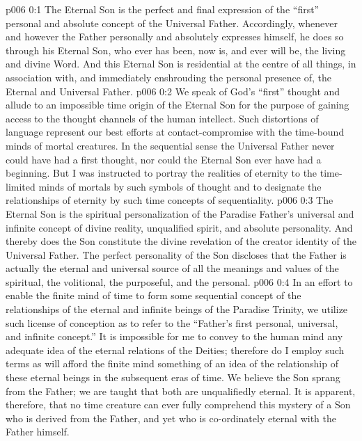 \author{Divine Counsellor}
\vs p006 0:1 The Eternal Son is the perfect and final expression of the “first” personal and absolute concept of the Universal Father. Accordingly, whenever and however the Father personally and absolutely expresses himself, he does so through his Eternal Son, who ever has been, now is, and ever will be, the living and divine Word. And this Eternal Son is residential at the centre of all things, in association with, and immediately enshrouding the personal presence of, the Eternal and Universal Father.
\vs p006 0:2 We speak of God’s “first” thought and allude to an impossible time origin of the Eternal Son for the purpose of gaining access to the thought channels of the human intellect. Such distortions of language represent our best efforts at contact\hyp{}compromise with the time\hyp{}bound minds of mortal creatures. In the sequential sense the Universal Father never could have had a first thought, nor could the Eternal Son ever have had a beginning. But I was instructed to portray the realities of eternity to the time\hyp{}limited minds of mortals by such symbols of thought and to designate the relationships of eternity by such time concepts of sequentiality.
\vs p006 0:3 The Eternal Son is the spiritual personalization of the Paradise Father’s universal and infinite concept of divine reality, unqualified spirit, and absolute personality. And thereby does the Son constitute the divine revelation of the creator identity of the Universal Father. The perfect personality of the Son discloses that the Father is actually the eternal and universal source of all the meanings and values of the spiritual, the volitional, the purposeful, and the personal.
\vs p006 0:4 In an effort to enable the finite mind of time to form some sequential concept of the relationships of the eternal and infinite beings of the Paradise Trinity, we utilize such license of conception as to refer to the “Father’s first personal, universal, and infinite concept.” It is impossible for me to convey to the human mind any adequate idea of the eternal relations of the Deities; therefore do I employ such terms as will afford the finite mind something of an idea of the relationship of these eternal beings in the subsequent eras of time. We believe the Son sprang from the Father; we are taught that both are unqualifiedly eternal. It is apparent, therefore, that no time creature can ever fully comprehend this mystery of a Son who is derived from the Father, and yet who is co\hyp{}ordinately eternal with the Father himself.
